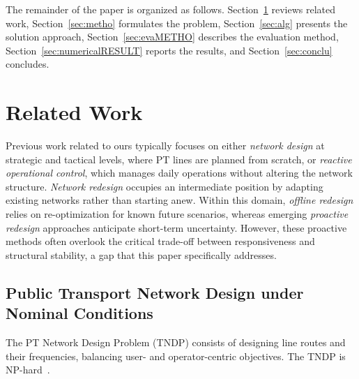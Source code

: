 \documentclass[a4paper,fleqn]{cas-sc}
\begin{document}
The remainder of the paper is organized as follows. 
Section~\ref{sec:relatedWork} reviews related work, Section~\ref{sec:metho} formulates the problem, Section~\ref{sec:alg} presents the solution approach, Section~\ref{sec:evaMETHO} describes the evaluation method, Section~\ref{sec:numericalRESULT} reports the results, and Section~\ref{sec:conclu} concludes.

\section{Related Work}\label{sec:relatedWork}

Previous work related to ours typically focuses on either \textit{network design} at strategic and tactical levels, where PT lines are planned from scratch, or \textit{reactive operational control}, which manages daily operations without altering the network structure.
\textit{Network redesign} occupies an intermediate position by adapting existing networks rather than starting anew.
Within this domain, \textit{offline redesign} relies on re-optimization for known future scenarios, whereas emerging \textit{proactive redesign} approaches anticipate short-term uncertainty.
However, these proactive methods often overlook the critical trade-off between responsiveness and structural stability, a gap that this paper specifically addresses.

\subsection{Public Transport Network Design under Nominal Conditions}
\label{sec:preventive}

The PT Network Design Problem (TNDP) consists of designing line routes and their frequencies, balancing user- and operator-centric objectives. 
The TNDP is NP-hard~\citep{magnanti1984network}.
\end{document}
